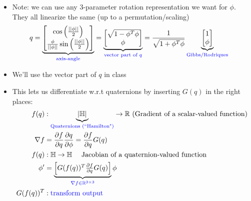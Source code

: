 \documentclass[11pt]{article}
\begin{document}
\begin{itemize}
    \item Note: we can use any 3-parameter rotation representation we want for $\phi$. They all linearize the same (up to a permutation/scaling)
    \begin{align*}
        q &= 
        \underbrace{
        \begin{bmatrix}
            \cos\left( \frac{||\phi||}{2} \right)
            \\
            \frac{\phi}{||\phi||}\sin \left( \frac{||\phi||}{2} \right)
        \end{bmatrix}
        }_{\textcolor{blue}{\text{axis-angle}}}
        =
        \underbrace{
        \begin{bmatrix}
            \sqrt{1 - \phi^T\phi}
            \\
            \phi
        \end{bmatrix}
        }_{\textcolor{blue}{\text{vector part of }q}}
        =
        \frac{1}{\sqrt{1 + \phi^T\phi}}
        \underbrace{
        \begin{bmatrix}
            1 \\
            \phi
        \end{bmatrix}
        }_{\textcolor{blue}{\text{Gibbs/Rodriques}}}
    \end{align*}
    \item We'll use the vector part of $q$ in class
    \item This lets us differentiate w.r.t quaternions by inserting $G(q)$ in the right places:
    \begin{align*}
        f(q)& : \underbrace{|\mathbb{H}|}_{\textcolor{blue}{\text{Quaternions (``Hamilton")} }}\rightarrow \mathbb{R} \text{ (Gradient of a scalar-valued function)}
        \\
        \nabla f &= \frac{\partial f}{\partial q}\frac{\partial q}{\partial \phi} = \frac{\partial f}{\partial q}G(q)
        \\
        f(q) &: \mathbb{H}\rightarrow\mathbb{H} \quad\text{ Jacobian of a quaternion-valued function}
        \\
        \phi' &= \underbrace{
        \begin{bmatrix}
            G(f(q))^T\frac{\partial f}{\partial q}G(q)
        \end{bmatrix}
        }_{\textcolor{blue}{\nabla f \in\mathbb{R}^{3\times 3}}}\phi
        \\
        G(f(q))^T&: \textcolor{blue}{\text{transform output}}

\end{align*}
\end{itemize}
\end{document}
